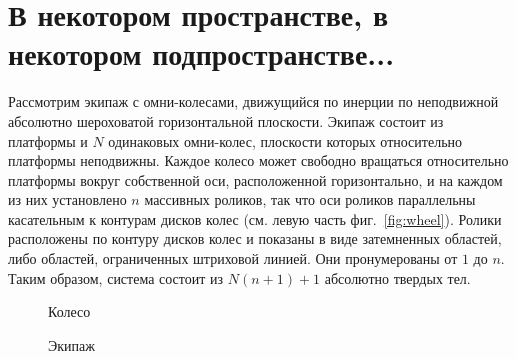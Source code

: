 \section{В некотором пространстве, в некотором подпространстве...}

Рассмотрим экипаж с омни-колесами, движущийся по инерции по неподвижной абсолютно шероховатой горизонтальной плоскости. Экипаж состоит из платформы и $N$ одинаковых омни-колес, плоскости которых относительно платформы неподвижны. Каждое колесо может свободно вращаться относительно платформы вокруг собственной оси, расположенной горизонтально, и на каждом из них установлено $n$ массивных роликов, так что оси роликов параллельны касательным к контурам дисков колес (см. левую часть фиг.~\ref{fig:wheel}). Ролики расположены по контуру дисков колес и показаны в виде затемненных областей, либо областей, ограниченных штриховой линией. Они пронумерованы от $1$ до $n$.
Таким образом, система состоит из $N(n+1) + 1$ абсолютно твердых тел. 


\begin{figure}[h]
        \centering
        \caption{Колесо}
        \label{fig:wheel}
    \endminipage
        \centering
        \caption{Экипаж}
        \label{fig:vehicle}
    \endminipage
\end{figure}

